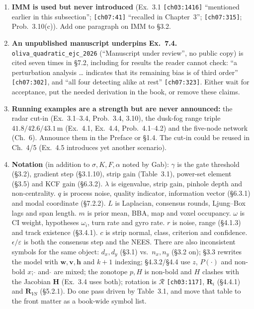 \documentclass[10pt,a4paper]{article}
\newcommand{\src}[1]{{\footnotesize\texttt{[#1]}}}
\newcommand{\key}[1]{\texttt{#1}}
\begin{document}
\begin{enumerate}
\item \textbf{IMM is used but never introduced} (Ex.~3.1 \src{ch03:1416} ``mentioned earlier in this subsection''; \src{ch07:41} ``recalled in Chapter~3''; \src{ch07:315}; Prob.~3.10(c)). Add one paragraph on IMM to \S3.2.
\item \textbf{An unpublished manuscript underpins Ex.~7.4.} \key{oliva\_quadratic\_ejc\_2026} (``Manuscript under review'', no public copy) is cited seven times in \S7.2, including for results the reader cannot check: ``a perturbation analysis \ldots{} indicates that its remaining bias is of third order'' \src{ch07:302}, and ``all four detecting alike at rest'' \src{ch07:323}. Either wait for acceptance, put the needed derivation in the book, or remove these claims.
\item \textbf{Running examples are a strength but are never announced:} the radar cut-in (Ex.~3.1--3.4, Prob.~3.4, 3.10), the dusk-fog range triple $41.8/42.6/43.1$\,m (Ex.~4.1, Ex.~4.4, Prob.~4.1--4.2) and the five-node network (Ch.~6). Announce them in the Preface or \S1.4. The cut-in could be reused in Ch.~4/5 (Ex.~4.5 introduces yet another scenario).
\item \textbf{Notation} (in addition to $\sigma,K,F,\alpha$ noted by Gab): $\gamma$ is the gate threshold (\S3.2), gradient step (\S3.1.10), strip gain (Table~3.1), power-set element (\S3.5) and KCF gain (\S6.3.2). $\lambda$ is eigenvalue, strip gain, pinhole depth and non-centrality. $q$ is process noise, quality indicator, information vector (\S6.3.1) and modal coordinate (\S7.2.2). $L$ is Laplacian, consensus rounds, Ljung--Box lags and span length. $m$ is prior mean, BBA, map and voxel occupancy. $\omega$ is CI weight, hypotheses $\omega_i$, turn rate and gyro rate. $r$ is noise, range (\S4.1.3) and track existence (\S3.4.1). $c$ is strip normal, class, criterion and confidence. $\epsilon/\varepsilon$ is both the consensus step and the NEES. There are also inconsistent symbols for the same object: $d_x,d_y$ (\S3.1) vs.\ $n_x,n_y$ (\S3.2 on); \S3.3 rewrites the model with $\mathbf{w},\mathbf{v},\mathbf{h}$ and $k\!+\!1$ indexing; \S4.3.2/\S4.4 use $z$, $P(\cdot)$ and non-bold $x$; $\hat{}$ and $\widehat{}$ are mixed; the zonotope $p,H$ is non-bold and $H$ clashes with the Jacobian $\mathbf{H}$ (Ex.~3.4 uses both); rotation is $\boldsymbol{\mathcal R}$ \src{ch03:117}, $\mathbf{R}_i$ (\S4.4.1) and $\mathbf{R}_{VS}$ (\S5.2.1). Do one pass driven by Table~3.1, and move that table to the front matter as a book-wide symbol list.
\end{enumerate}
\end{document}
